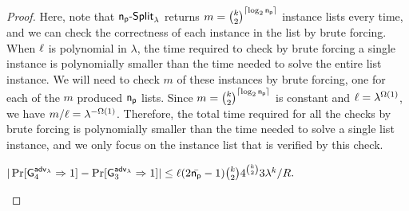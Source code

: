 \begin{proof}
Here, note that $\mathsf{n_p}\text{-}{\mathsf{Split}}_\lambda$ returns $m = \binom{k}{2}^{\lceil\log_2\mathsf{n_p}\rceil}$ instance lists every time, and we can check the correctness of each instance in the list by brute forcing. When $\ell$ is polynomial in $\lambda$, the time required to check by brute forcing a single instance is polynomially smaller than the time needed to solve the entire list instance. We will need to check $m$ of these instances by brute forcing, one for each of the $m$ produced $\mathsf{n_p}$ lists. Since $m=\binom{k}{2}^{\lceil\log_2\mathsf{n_p}\rceil}$ is constant and $\ell=\lambda^{\Omega(1)}$, we have $m/\ell=\lambda^{-\Omega(1)}$. Therefore, the total time required for all the checks by brute forcing is polynomially smaller than the time needed to solve a single list instance, and we only focus on the instance list that is verified by this check.
\begin{lemma}
\label{lem:time-nike-3}
	$|\Pr[\mathsf{G}_4^{{\mathsf{adv}}_\lambda}\Rightarrow 1]-\Pr[\mathsf{G}_3^{{\mathsf{adv}}_\lambda}\Rightarrow 1]| \leq \ell(2\bar{\mathsf{n_p}}-1)\binom{k}{2}4^{\binom{k}{2}}3\lambda^k/{R}.$
\end{lemma}

\end{proof}
